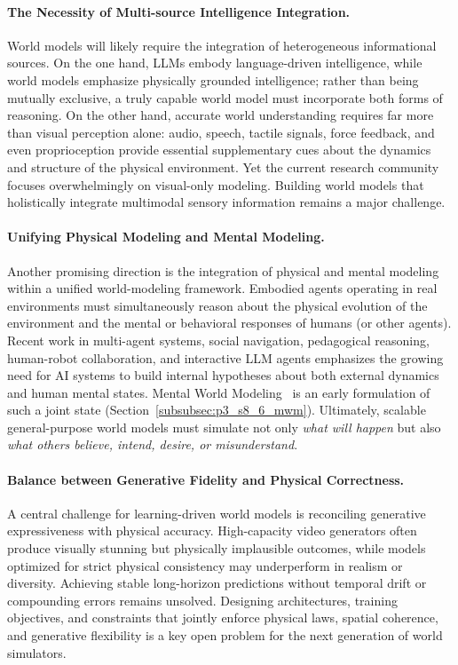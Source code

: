 \paragraph{The Necessity of Multi-source Intelligence Integration.}
World models will likely require the integration of heterogeneous informational sources.
On the one hand, LLMs embody language-driven intelligence, while world models emphasize physically grounded intelligence; rather than being mutually exclusive, a truly capable world model must incorporate both forms of reasoning.
On the other hand, accurate world understanding requires far more than visual perception alone: audio, speech, tactile signals, force feedback, and even proprioception provide essential supplementary cues about the dynamics and structure of the physical environment. Yet the current research community focuses overwhelmingly on visual-only modeling.
Building world models that holistically integrate multimodal sensory information remains a major challenge.


\paragraph{Unifying Physical Modeling and Mental Modeling.}
Another promising direction is the integration of physical and mental modeling within a unified world-modeling framework.
Embodied agents operating in real environments must simultaneously reason about the physical evolution of the environment and the mental or behavioral responses of humans (or other agents).
Recent work in multi-agent systems, social navigation, pedagogical reasoning, human-robot collaboration, and interactive LLM agents emphasizes the growing need for AI systems to build internal hypotheses about both external dynamics and human mental states. 
Mental World Modeling~\cite{fei2026mental} is an early formulation of such a joint state (Section~\ref{subsubsec:p3_s8_6_mwm}).
Ultimately, scalable general-purpose world models must simulate not only \emph{what will happen} but also \emph{what others believe, intend, desire, or misunderstand}.


\paragraph{Balance between Generative Fidelity and Physical Correctness.}
A central challenge for learning-driven world models is reconciling generative expressiveness with physical accuracy.
High-capacity video generators often produce visually stunning but physically implausible outcomes, while models optimized for strict physical consistency may underperform in realism or diversity.
Achieving stable long-horizon predictions without temporal drift or compounding errors remains unsolved.
Designing architectures, training objectives, and constraints that jointly enforce physical laws, spatial coherence, and generative flexibility is a key open problem for the next generation of world simulators.


